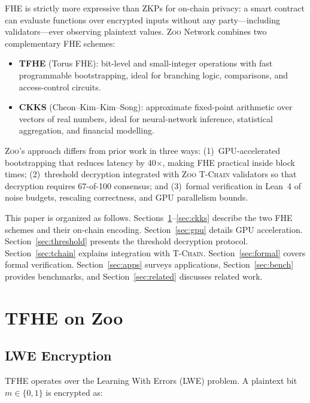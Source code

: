 \documentclass[11pt,letterpaper]{article}
\theoremstyle{definition}
\theoremstyle{remark}
\newcommand{\Zoo}{\textsc{Zoo}}
\newcommand{\TChain}{\textsc{T-Chain}}
\newcommand{\TFHE}{\textsc{TFHE}}
\newcommand{\CKKS}{\textsc{CKKS}}
\newcommand{\LWE}{\textsc{LWE}}
\begin{document}
FHE is strictly more expressive than ZKPs for on-chain privacy: a smart contract can evaluate functions over encrypted inputs without any party---including validators---ever observing plaintext values. \Zoo{} Network combines two complementary FHE schemes:

\begin{itemize}
  \item \textbf{\TFHE{}} (Torus FHE): bit-level and small-integer operations with fast programmable bootstrapping, ideal for branching logic, comparisons, and access-control circuits.
  \item \textbf{\CKKS{}} (Cheon--Kim--Kim--Song): approximate fixed-point arithmetic over vectors of real numbers, ideal for neural-network inference, statistical aggregation, and financial modelling.
\end{itemize}

\Zoo{}'s approach differs from prior work in three ways: (1)~GPU-accelerated bootstrapping that reduces latency by 40$\times$, making FHE practical inside block times; (2)~threshold decryption integrated with \Zoo{} \TChain{} validators so that decryption requires 67-of-100 consensus; and (3)~formal verification in Lean~4 of noise budgets, rescaling correctness, and GPU parallelism bounds.

This paper is organized as follows. Sections~\ref{sec:tfhe}--\ref{sec:ckks} describe the two FHE schemes and their on-chain encoding. Section~\ref{sec:gpu} details GPU acceleration. Section~\ref{sec:threshold} presents the threshold decryption protocol. Section~\ref{sec:tchain} explains integration with \TChain{}. Section~\ref{sec:formal} covers formal verification. Section~\ref{sec:apps} surveys applications, Section~\ref{sec:bench} provides benchmarks, and Section~\ref{sec:related} discusses related work.

\section{TFHE on Zoo}
\label{sec:tfhe}

\subsection{LWE Encryption}

\TFHE{} operates over the Learning With Errors (\LWE{}) problem. A plaintext bit $m \in \{0,1\}$ is encrypted as:
\end{document}
